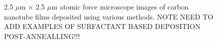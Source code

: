 \documentclass[
  letterpaper,
  DIV=11,
  numbers=noendperiod]{scrartcl}
\begin{document}
\begin{figure}
\begin{minipage}[t]{0.47\linewidth}
{{}

}

\end{minipage}%
\newline
\begin{minipage}[t]{0.26\linewidth}

{\centering 

~

}

\end{minipage}%
%
\begin{minipage}[t]{0.47\linewidth}

{\centering 


}

\end{minipage}%
%
\begin{minipage}[t]{0.26\linewidth}

{\centering 

~

}

\end{minipage}%

\caption{\label{fig-afm-morphology}2.5 \(\mu\)m \(\times\) 2.5 \(\mu\)m
atomic force microscope images of carbon nanotube films deposited using
various methods. NOTE NEED TO ADD EXAMPLES OF SURFACTANT BASED
DEPOSITION POST-ANNEALLING!!!}

\end{figure}
\end{document}
